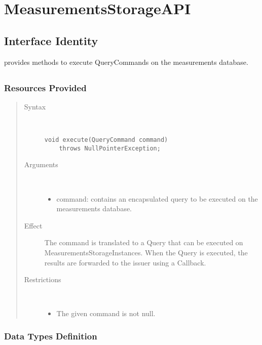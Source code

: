 \section{MeasurementsStorageAPI}

\subsection{Interface Identity}

\npar {} provides methods to execute
QueryCommands on the measurements database.

\subsection{}

\subsubsection{Resources Provided}

\begin{quote}
	\begin{description}
		\item[Syntax] \ 
		\begin{verbatim}
void execute(QueryCommand command) 
    throws NullPointerException;
		\end{verbatim}
		\item[Arguments] \
		\begin{itemize}
			\item command: contains an encapsulated query to be executed on the
			measurements database.
		\end{itemize}
		\item[Effect] The command is translated to a Query that can be executed on
		MeasurementsStorageInstances. When the Query is executed, the results are
		forwarded to the issuer using a Callback.
		\item[Restrictions] \ 
		\begin{itemize}
			\item The given command is not null.
		\end{itemize}
	\end{description} 
\end{quote}

\subsubsection{Data Types Definition}

